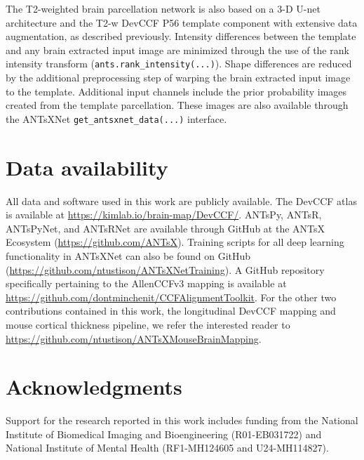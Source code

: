 \documentclass[
  12pt,
]{article}
\begin{document}
The T2-weighted brain parcellation network is also based on a 3-D U-net
architecture and the T2-w DevCCF P56 template component with extensive
data augmentation, as described previously. Intensity differences
between the template and any brain extracted input image are minimized
through the use of the rank intensity transform
(\texttt{ants.rank\_intensity(...)}). Shape differences are reduced by
the additional preprocessing step of warping the brain extracted input
image to the template. Additional input channels include the prior
probability images created from the template parcellation. These images
are also available through the ANTsXNet
\texttt{get\_antsxnet\_data(...)} interface.

\clearpage

\hypertarget{data-availability}{%
\section*{Data availability}\label{data-availability}}

All data and software used in this work are publicly available. The
DevCCF atlas is available at \url{https://kimlab.io/brain-map/DevCCF/}.
ANTsPy, ANTsR, ANTsPyNet, and ANTsRNet are available through GitHub at
the ANTsX Ecosystem (\url{https://github.com/ANTsX}). Training scripts
for all deep learning functionality in ANTsXNet can also be found on
GitHub (\url{https://github.com/ntustison/ANTsXNetTraining}). A GitHub
repository specifically pertaining to the AllenCCFv3 mapping is
available at \url{https://github.com/dontminchenit/CCFAlignmentToolkit}.
For the other two contributions contained in this work, the longitudinal
DevCCF mapping and mouse cortical thickness pipeline, we refer the
interested reader to
\url{https://github.com/ntustison/ANTsXMouseBrainMapping}.

\clearpage

\hypertarget{acknowledgments}{%
\section*{Acknowledgments}\label{acknowledgments}}

Support for the research reported in this work includes funding from the
National Institute of Biomedical Imaging and Bioengineering
(R01-EB031722) and National Institute of Mental Health (RF1-MH124605 and
U24-MH114827).

\clearpage
\end{document}
